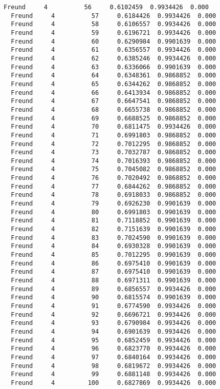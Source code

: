 \documentclass[11pt]{article}
\begin{document}
\begin{Verbatim}[commandchars=\\\{\}]
  Freund     4          56     0.6102459  0.9934426  0.000
  Freund     4          57     0.6184426  0.9934426  0.000
  Freund     4          58     0.6106557  0.9934426  0.000
  Freund     4          59     0.6196721  0.9934426  0.000
  Freund     4          60     0.6290984  0.9901639  0.000
  Freund     4          61     0.6356557  0.9934426  0.000
  Freund     4          62     0.6385246  0.9934426  0.000
  Freund     4          63     0.6336066  0.9901639  0.000
  Freund     4          64     0.6348361  0.9868852  0.000
  Freund     4          65     0.6344262  0.9868852  0.000
  Freund     4          66     0.6413934  0.9868852  0.000
  Freund     4          67     0.6647541  0.9868852  0.000
  Freund     4          68     0.6655738  0.9868852  0.000
  Freund     4          69     0.6688525  0.9868852  0.000
  Freund     4          70     0.6811475  0.9934426  0.000
  Freund     4          71     0.6991803  0.9868852  0.000
  Freund     4          72     0.7012295  0.9868852  0.000
  Freund     4          73     0.7032787  0.9868852  0.000
  Freund     4          74     0.7016393  0.9868852  0.000
  Freund     4          75     0.7045082  0.9868852  0.000
  Freund     4          76     0.7020492  0.9868852  0.000
  Freund     4          77     0.6844262  0.9868852  0.000
  Freund     4          78     0.6918033  0.9868852  0.000
  Freund     4          79     0.6926230  0.9901639  0.000
  Freund     4          80     0.6991803  0.9901639  0.000
  Freund     4          81     0.7118852  0.9901639  0.000
  Freund     4          82     0.7151639  0.9901639  0.000
  Freund     4          83     0.7024590  0.9901639  0.000
  Freund     4          84     0.6930328  0.9901639  0.000
  Freund     4          85     0.7012295  0.9901639  0.000
  Freund     4          86     0.6975410  0.9901639  0.000
  Freund     4          87     0.6975410  0.9901639  0.000
  Freund     4          88     0.6971311  0.9901639  0.000
  Freund     4          89     0.6856557  0.9934426  0.000
  Freund     4          90     0.6815574  0.9901639  0.000
  Freund     4          91     0.6774590  0.9934426  0.000
  Freund     4          92     0.6696721  0.9934426  0.000
  Freund     4          93     0.6790984  0.9934426  0.000
  Freund     4          94     0.6901639  0.9934426  0.000
  Freund     4          95     0.6852459  0.9934426  0.000
  Freund     4          96     0.6823770  0.9934426  0.000
  Freund     4          97     0.6840164  0.9934426  0.000
  Freund     4          98     0.6819672  0.9934426  0.000
  Freund     4          99     0.6881148  0.9934426  0.000
  Freund     4         100     0.6827869  0.9934426  0.000

\end{Verbatim}
\end{document}
